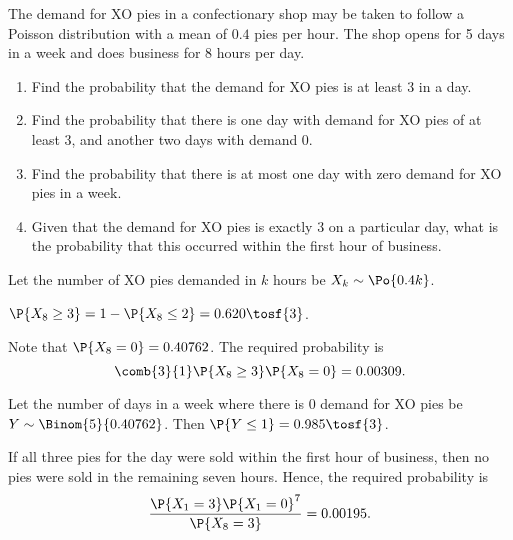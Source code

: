 \begin{problem}
    The demand for XO pies in a confectionary shop may be taken to follow a Poisson distribution with a mean of $0.4$ pies per hour. The shop opens for 5 days in a week and does business for 8 hours per day.

    \begin{enumerate}
        \item Find the probability that the demand for XO pies is at least 3 in a day.
        \item Find the probability that there is one day with demand for XO pies of at least 3, and another two days with demand 0.
        \item Find the probability that there is at most one day with zero demand for XO pies in a week.
        \item Given that the demand for XO pies is exactly 3 on a particular day, what is the probability that this occurred within the first hour of business.
    \end{enumerate}
\end{problem}
\begin{solution}
    Let the number of XO pies demanded in $k$ hours be $X_k \sim \Po{0.4k}$.

    \begin{ppart}
        $\P{X_8 \geq 3} = 1 - \P{X_8 \leq 2} = 0.620 \tosf{3}$.
    \end{ppart}
    \begin{ppart}
        Note that $\P{X_8 = 0} = 0.40762$. The required probability is \[\comb{3}{1} \P{X_8 \geq 3} \P{X_8 = 0} = 0.00309.\]
    \end{ppart}
    \begin{ppart}
        Let the number of days in a week where there is 0 demand for XO pies be $Y \sim \Binom{5}{0.40762}$. Then $\P{Y \leq 1} = 0.985 \tosf{3}$.
    \end{ppart}
    \begin{ppart}
        If all three pies for the day were sold within the first hour of business, then no pies were sold in the remaining seven hours. Hence, the required probability is \[\frac{\P{X_1 = 3}\P{X_1 = 0}^7}{\P{X_8 = 3}} = 0.00195.\]
    \end{ppart}

\end{solution}

